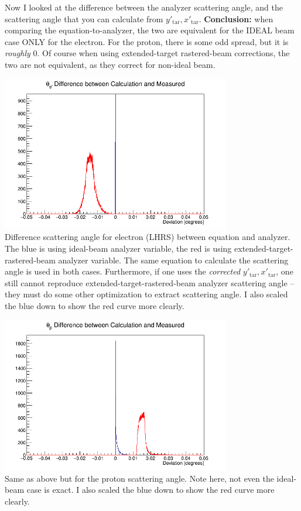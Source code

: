 \documentclass{article}
\begin{document}
\clearpage
Now I looked at the difference between the analyzer scattering angle, and the scattering angle that you can calculate from $y'_{\textrm{tar}} , x'_{\textrm{tar}}$. \textbf{Conclusion:} when comparing the equation-to-analyzer, the two are equivalent for the IDEAL beam case ONLY for the electron. For the proton, there is some odd spread, but it is \textit{roughly} 0. Of course when using extended-target rastered-beam corrections, the two are not equivalent, as they correct for non-ideal beam.

\begin{center}
\includegraphics[width=10cm]{thetaDiffe.png}\\
Difference scattering angle for electron (LHRS) between equation and analyzer. The blue is using ideal-beam analyzer variable, the red is using extended-target-rastered-beam analyzer variable. The same equation to calculate the scattering angle is used in both cases. Furthermore, if one uses the \textit{corrected} $y'_{\textrm{tar}} , x'_{\textrm{tar}}$, one still cannot reproduce extended-target-rastered-beam analyzer scattering angle -- they must do some other optimization to extract scattering angle. I also scaled the blue down to show the red curve more clearly.
\end{center}


\begin{center}
\includegraphics[width=10cm]{thetaDiffp.png}\\
Same as above but for the proton scattering angle. Note here, not even the ideal-beam case is exact. I also scaled the blue down to show the red curve more clearly.
\end{center}
\end{document}

